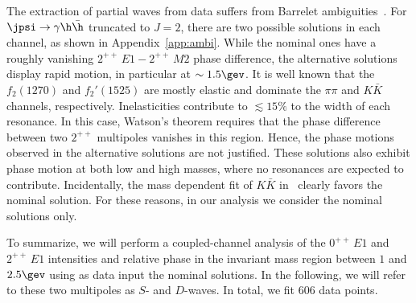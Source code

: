 The extraction of partial waves from data suffers from Barrelet ambiguities~\cite{Barrelet:1971pw}. For $\jpsi \to \gamma \h\bar \h$ truncated to $J=2$, there are two possible solutions in each  channel, as shown in Appendix~\ref{app:ambi}.
While the nominal ones have a roughly vanishing $2^{++}\,E1-2^{++}\,M2$ phase difference, the alternative solutions display rapid motion, in particular at $\sim 1.5\gev$.  It is well known that the $f_2(1270)$ and $f_2'(1525)$ are mostly elastic and dominate the $\pi\pi$ and $K\bar K$ channels, respectively. Inelasticities contribute to $\lesssim 15\%$ to the width of each resonance. 
In this case, 
Watson's theorem requires that the phase difference between two $2^{++}$ multipoles vanishes in this region.
Hence, the phase motions observed in the alternative solutions are not
justified. These solutions also exhibit phase motion at both low and high masses, where no resonances are expected to contribute. Incidentally, the mass dependent fit of $K\bar K$ in~\cite{Ablikim:2018izx} clearly favors the nominal solution. For these reasons, in our analysis we consider the nominal solutions only.

To summarize, we will perform a coupled-channel analysis of the $0^{++}\,E1$ and $2^{++}\,E1$ intensities and relative phase in the invariant mass region between $1$ and $2.5\gev$ using as data input the nominal solutions. In the following, we will refer to these two multipoles as $S$- and $D$-waves. In total, we fit 606 data points.

